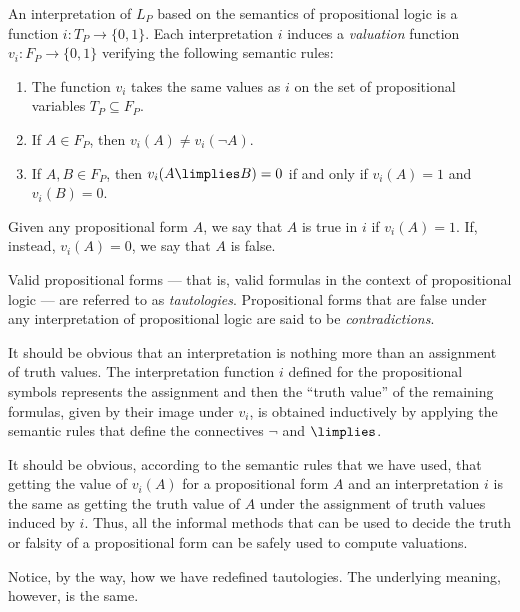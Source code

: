 \begin{definition}
An interpretation of $L_P$ based on the semantics of propositional logic is a function $i : T_P \longrightarrow \{0,1\}$. Each interpretation $i$ induces a \emph{valuation} function $v_i: F_P \longrightarrow \{0,1\}$  verifying the following semantic rules:
\begin{enumerate}
\item The function $v_i$ takes the same values as $i$ on the set of propositional variables $T_P \subseteq F_P$.
\item If $A\in F_P$, then $v_i(A) \neq v_i(\lnot A)$.
\item If $A,B\in F_P$, then $v_i(A\limplies B) = 0$ if and only if $v_i(A) = 1$ and $v_i(B) = 0$.
\end{enumerate}
Given any propositional form $A$, we say that $A$ is true in $i$ if $v_i(A) = 1$. If, instead, $v_i(A) = 0$, we say that $A$ is false.

Valid propositional forms --- that is, valid formulas in the context of propositional logic --- are referred to as \emph{tautologies}.
Propositional forms that are false under any interpretation of propositional logic are said to be \emph{contradictions}.
\end{definition}

\begin{para}
It should be obvious that an interpretation is nothing more than an assignment of truth values. The interpretation function $i$ defined for the propositional symbols represents the assignment and then the ``truth value'' of the remaining formulas, given by their image under $v_i$, is obtained inductively by applying the semantic rules that define the connectives $\lnot$ and $\limplies$.

It should be obvious, according to the semantic rules that we have used, that getting the value of $v_i(A)$ for a propositional form $A$ and an interpretation $i$ is the same as getting the truth value of $A$ under the assignment of truth values induced by $i$. Thus, all the informal methods that can be used to decide the truth or falsity of a propositional form can be safely used to compute valuations.

Notice, by the way, how we have redefined tautologies. The underlying meaning, however, is the same.
\end{para}

